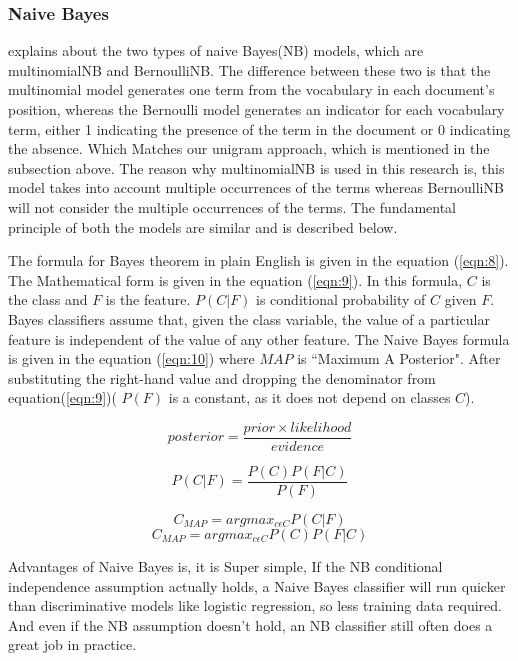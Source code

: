 \subsubsection{Naive Bayes}

\cite{Manning:2008} explains about the two types of naive Bayes(NB) models, which are multinomialNB and BernoulliNB. The difference between these two is that the multinomial model generates one term from the vocabulary in each document's position, whereas the Bernoulli model generates an indicator for each vocabulary term, either 1 indicating the presence of the term in the document or 0 indicating the absence. Which Matches our unigram approach, which is mentioned in the subsection above. The reason why multinomialNB is used in this research is, this model takes into account multiple occurrences of the terms whereas BernoulliNB will not consider the multiple occurrences of the terms. The fundamental principle of both the models are similar and is described below.

The formula for Bayes theorem in plain English is given in the equation (\ref{eqn:8}). The Mathematical form is given in the equation (\ref{eqn:9}). In this formula, $C$ is the class and $F$ is the feature. $P(C|F)$ is conditional probability of $C$ given $F$. Bayes classifiers assume that, given the class variable, the value of a particular feature is independent of the value of any other feature. The Naive Bayes formula is given in the equation (\ref{eqn:10}) where $MAP$ is ``Maximum A
Posterior". After substituting the right-hand value and dropping the denominator from equation(\ref{eqn:9})( $P(F)$ is a constant, as it does not depend on classes $C$). 



\begin{equation}
\label{eqn:8}
posterior = \frac{prior \times likelihood}{evidence}
\end{equation}

\begin{equation}
\label{eqn:9}
P(C|F) = \frac{P(C) P(F|C) }{P(F)}
\end{equation}

\begin{equation}
\label{eqn:10}
C_{MAP} = argmax_{c\epsilon C} P(C|F) 
\end{equation}
\begin{equation}
\label{eqn:11}
C_{MAP} = argmax_{c\epsilon C} P(C) P(F|C)  
\end{equation}


Advantages of Naive Bayes is, it is Super simple, If the NB conditional independence assumption actually holds, a Naive Bayes classifier will run quicker than discriminative models like logistic regression, so less training data required. And even if the NB assumption doesn’t hold, an NB classifier still often does a great job in practice.


